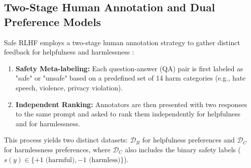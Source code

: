 \documentclass[10pt,journal,compsoc]{IEEEtran} %
\begin{document}
\subsection{Two-Stage Human Annotation and Dual Preference Models}
Safe RLHF employs a two-stage human annotation strategy to gather distinct feedback for helpfulness and harmlessness \cite{Dai2023SafeRLHF}:
\begin{enumerate}
    \item \textbf{Safety Meta-labeling:} Each question-answer (QA) pair is first labeled as "safe" or "unsafe" based on a predefined set of 14 harm categories (e.g., hate speech, violence, privacy violation).
    \item \textbf{Independent Ranking:} Annotators are then presented with two responses to the same prompt and asked to rank them independently for helpfulness and for harmlessness.
\end{enumerate}
This process yields two distinct datasets: $\mathcal{D}_R$ for helpfulness preferences and $\mathcal{D}_C$ for harmlessness preferences, where $\mathcal{D}_C$ also includes the binary safety labels ($s(y) \in \{+1 \text{ (harmful)}, -1 \text{ (harmless)}\}$).
\end{document}
